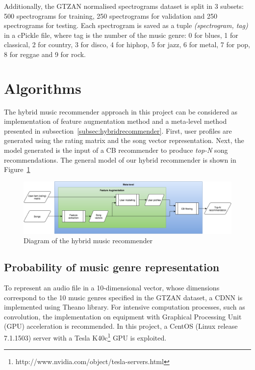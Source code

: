 Additionally, the GTZAN normalised spectrograms dataset is split in 3 subsets: 500 spectrograms for training, 250 spectrograms for validation and 250 spectrograms for testing. Each spectrogram is saved as a tuple \textit{(spectrogram, tag)} in a cPickle file, where tag is the number of the music genre: 0 for blues, 1 for classical, 2 for country, 3 for disco, 4 for hiphop, 5 for jazz, 6 for metal, 7 for pop, 8 for reggae and 9 for rock.

\section{Algorithms}
\label{sec:algorithms}
The hybrid music recommender approach in this project can be considered as implementation of feature augmentation method and a meta-level method presented in subsection~\ref{subsec:hybridrecommender}. First, user profiles are generated using the rating matrix and the song vector representation. Next, the model generated is the input of a CB recommender to produce \emph{top-N} song recommendations. The general model of our hybrid recommender is shown in Figure~\ref{fig:generalhybrid}
\begin{figure}[ht!]
	\centering
	\includegraphics[width=\textwidth]{chapter3/General_model_hybrid_recommender.png}
	\caption{Diagram of the hybrid music recommender}
	\label{fig:generalhybrid}
\end{figure}

\subsection{Probability of music genre representation}
\label{subsec:genre}
To represent an audio file in a 10-dimensional vector, whose dimensions correspond to the 10 music genres specified in the GTZAN dataset, a CDNN is implemented using Theano library. For intensive computation processes, such as convolution, the implementation on equipment with Graphical Processing Unit (GPU) acceleration is recommended. In this project, a CentOS (Linux release 7.1.1503) server with a Tesla K40c\footnote{http://www.nvidia.com/object/tesla-servers.html} GPU is exploited.

